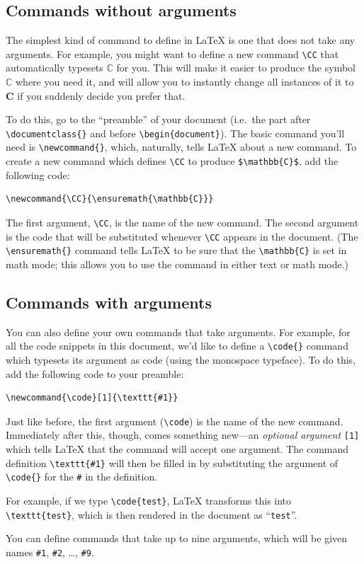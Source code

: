 \documentclass{article}
\newcommand*{\code}[1]{\texttt{#1}}
\begin{document}
\subsection{Commands without arguments}
The simplest kind of command to define in \LaTeX{} is one that does not take any arguments.
For example, you might want to define a new command \code{\textbackslash{}CC} that automatically typesets $\mathbb{C}$ for you.
This will make it easier to produce the symbol $\mathbb{C}$ where you need it, and will allow you to instantly change all instances of it to $\mathbf{C}$ if you suddenly decide you prefer that.

To do this, go to the \enquote{preamble} of your document (i.e.~the part after \code{\textbackslash{}documentclass\{\}} and before \code{\textbackslash{}begin\{document\}}).
The basic command you'll need is \code{\textbackslash{}newcommand\{\}}, which, naturally, tells \LaTeX{} about a new command.
To create a new command which defines \code{\textbackslash{}CC} to produce \code{\$\textbackslash{}mathbb\{C\}\$}, add the following code:
\begin{verbatim}
\newcommand{\CC}{\ensuremath{\mathbb{C}}}
\end{verbatim}
The first argument, \code{\textbackslash{}CC}, is the name of the new command.
The second argument is the code that will be substituted whenever \code{\textbackslash{}CC} appears in the document.
(The \code{\textbackslash{}ensuremath\{\}} command tells \LaTeX{} to be sure that the \code{\textbackslash{}mathbb\{C\}} is set in math mode; this allows you to use the command in either text or math mode.)

\subsection{Commands with arguments}
You can also define your own commands that take arguments.
For example, for all the code snippets in this document, we'd like to define a \code{\textbackslash{}code\{\}} command which typesets its argument as code (using the monospace typeface).
To do this, add the following code to your preamble:
\begin{verbatim}
\newcommand{\code}[1]{\texttt{#1}}
\end{verbatim}
Just like before, the first argument (\code{\textbackslash{}code}) is the name of the new command.
Immediately after this, though, comes something new---an \emph{optional argument} \code{[1]} which tells \LaTeX{} that the command will accept one argument.
The command definition \code{\textbackslash{}texttt\{\#1\}} will then be filled in by substituting the argument of \code{\textbackslash{}code\{\}} for the \code{\#} in the definition.

For example, if we type \code{\textbackslash{}code\{test\}}, \LaTeX{} transforms this into \code{\textbackslash{}texttt\{test\}}, which is then rendered in the document as \enquote{\code{test}}.

You can define commands that take up to nine arguments, which will be given names \code{\#1}, \code{\#2}, \dots, \code{\#9}.
\end{document}
